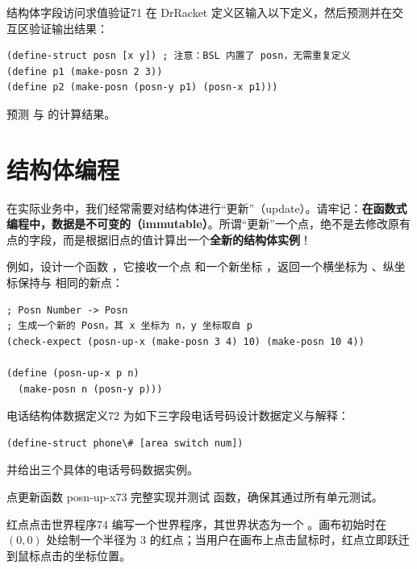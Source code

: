 \begin{exercise}{结构体字段访问求值验证}{71}
在 DrRacket 定义区输入以下定义，然后预测并在交互区验证输出结果：
\begin{lstlisting}[language=BSL]
(define-struct posn [x y]) ; 注意：BSL 内置了 posn，无需重复定义
(define p1 (make-posn 2 3))
(define p2 (make-posn (posn-y p1) (posn-x p1)))
\end{lstlisting}
预测  与  的计算结果。
\end{exercise}

\section{结构体编程}
\label{sec:5.6_programming_with_structures}

在实际业务中，我们经常需要对结构体进行“更新”（update）。请牢记：\textbf{在函数式编程中，数据是不可变的（immutable）}。所谓“更新”一个点，绝不是去修改原有点的字段，而是根据旧点的值计算出一个\textbf{全新的结构体实例}！

例如，设计一个函数 ，它接收一个点  和一个新坐标 ，返回一个横坐标为 、纵坐标保持与  相同的新点：

\begin{lstlisting}[language=BSL]
; Posn Number -> Posn
; 生成一个新的 Posn，其 x 坐标为 n，y 坐标取自 p
(check-expect (posn-up-x (make-posn 3 4) 10) (make-posn 10 4))

(define (posn-up-x p n)
  (make-posn n (posn-y p)))
\end{lstlisting}

\begin{exercise}{电话结构体数据定义}{72}
为如下三字段电话号码设计数据定义与解释：
\begin{lstlisting}[language=BSL]
(define-struct phone\# [area switch num])
\end{lstlisting}
并给出三个具体的电话号码数据实例。
\end{exercise}

\begin{exercise}{点更新函数 posn-up-x}{73}
完整实现并测试  函数，确保其通过所有单元测试。
\end{exercise}

\begin{exercise}{红点点击世界程序}{74}
编写一个世界程序，其世界状态为一个 。画布初始时在 $(0, 0)$ 处绘制一个半径为 3 的红点；当用户在画布上点击鼠标时，红点立即跃迁到鼠标点击的坐标位置。
\end{exercise}

